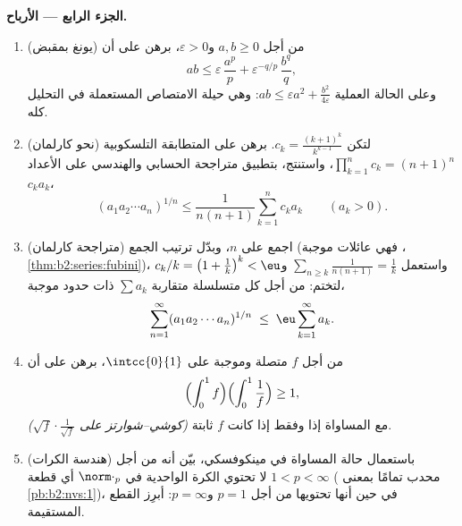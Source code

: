 \begin{problem}
\medskip
\noindent\textbf{الجزء الرابع --- الأرباح.}
\begin{enumerate}[resume]
  \item (يونغ بمقبض) من أجل $a, b \geq 0$ و$\varepsilon >
        0$، برهن على أن
        \[
        ab \leq \varepsilon\,\frac{a^p}{p} +
        \varepsilon^{-q/p}\,\frac{b^q}{q},
        \]
        وعلى الحالة العملية $ab \leq \varepsilon a^2 +
        \frac{b^2}{4\varepsilon}$: وهي حيلة الامتصاص المستعملة
        في التحليل كله.
  \item (نحو كارلمان) لتكن $c_k = \frac{(k+1)^k}{k^{k-1}}$.
        برهن على المتطابقة التلسكوبية $\prod_{k=1}^{n}c_k =
        (n+1)^n$، واستنتج، بتطبيق متراجحة الحسابي والهندسي على الأعداد
        $c_ka_k$،
        \[
        (a_1a_2\cdots a_n)^{1/n} \leq
        \frac{1}{n(n+1)}\sum_{k=1}^{n} c_k a_k
        \qquad (a_k > 0).
        \]
  \item (متراجحة كارلمان) اجمع على $n$، وبدّل
        ترتيب الجمع (فهي عائلات موجبة ،
        \cref{thm:b2:series:fubini})، واستعمل $\sum_{n \geq
        k}\frac{1}{n(n+1)} = \frac1k$ و$c_k/k = \bigl(1 +
        \frac1k\bigr)^k < \eu$ لتختم: من أجل كل
        متسلسلة متقاربة $\sum a_k$ ذات حدود موجبة،
        \[
        \sum_{n=1}^{\infty}(a_1a_2\cdots a_n)^{1/n}
        \;\leq\; \eu\sum_{k=1}^{\infty}a_k .
        \]
  \item من أجل $f$ متصلة وموجبة على $\intcc{0}{1}$،
        برهن على أن
        \[
        \Bigl(\int_0^1 f\Bigr)\Bigl(\int_0^1\frac1f\Bigr)
        \geq 1,
        \]
        مع المساواة إذا وفقط إذا كانت $f$ ثابتة
        \emph{(كوشي--شوارتز على $\sqrt f\cdot\frac1{\sqrt
        f}$)}.
  \item (هندسة الكرات) باستعمال حالة المساواة في
        مينكوفسكي، بيّن أنه من أجل $1 < p < \infty$ لا تحتوي
        الكرة الواحدية في $\norm\cdot_p$ أي قطعة (
        محدب تمامًا بمعنى
        \cref{pb:b2:nvs:1})، في حين أنها تحتويها من أجل $p = 1$ و$p =
        \infty$: أبرِز القطع المستقيمة.
\end{enumerate}


\end{problem}
